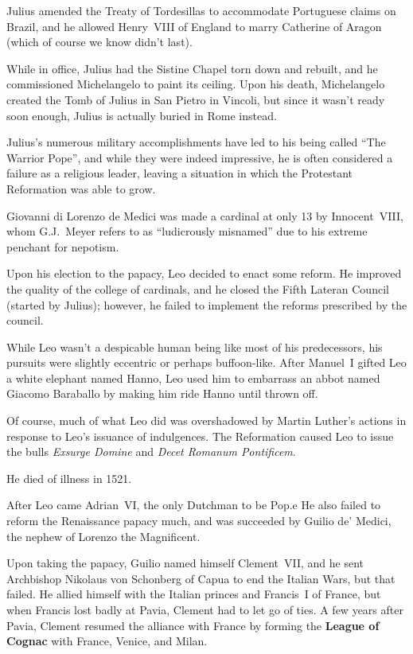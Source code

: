 Julius amended the Treaty of Tordesillas to accommodate Portuguese claims on Brazil,
and he allowed Henry~VIII of England to marry Catherine of Aragon
(which of course we know didn't last).

While in office, Julius had the Sistine Chapel torn down and rebuilt,
and he commissioned Michelangelo to paint its ceiling.
Upon his death, Michelangelo created the Tomb of Julius in San Pietro in Vincoli,
but since it wasn't ready soon enough, Julius is actually buried in Rome instead.

Julius's numerous military accomplishments have led to his being called ``The Warrior Pope'',
and while they were indeed impressive, he is often considered a failure as a religious leader,
leaving a situation in which the Protestant Reformation was able to grow.


Giovanni di Lorenzo de Medici was made a cardinal at only 13 by Innocent~VIII,
whom G.J.\ Meyer refers to as ``ludicrously misnamed'' due to his extreme penchant for nepotism.

Upon his election to the papacy, Leo decided to enact some reform.
He improved the quality of the college of cardinals,
and he closed the Fifth Lateran Council (started by Julius);
however, he failed to implement the reforms prescribed by the council.

While Leo wasn't a despicable human being like most of his predecessors,
his pursuits were slightly eccentric or perhaps buffoon-like.
After Manuel~I gifted Leo a white elephant named Hanno,
Leo used him to embarrass an abbot named Giacomo Baraballo by making him ride Hanno until thrown off.

Of course, much of what Leo did was overshadowed by Martin Luther's actions
in response to Leo's issuance of indulgences.
The Reformation caused Leo to issue
the bulls \textit{Exsurge Domine} and \textit{Decet Romanum Pontificem}.

He died of illness in 1521.


After Leo came Adrian~VI, the only Dutchman to be Pop.e
He also failed to reform the Renaissance papacy much,
and was succeeded by Guilio de' Medici,
the nephew of Lorenzo the Magnificent.

Upon taking the papacy, Guilio named himself Clement~VII,
and he sent Archbishop Nikolaus von Schonberg of Capua to end the Italian Wars, but that failed.
He allied himself with the Italian princes and Francis~I of France,
but when Francis lost badly at Pavia, Clement had to let go of ties.
A few years after Pavia, Clement resumed the alliance with France
by forming the \textbf{League of Cognac} with France, Venice, and Milan.

